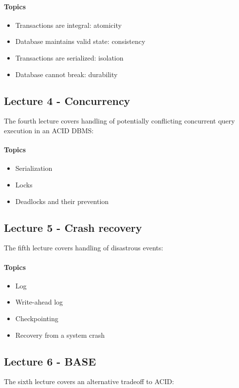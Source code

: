 		\paragraph*{Topics}
			\begin{itemize}
				\item Transactions are integral: atomicity
				\item Database maintains valid state: consistency
				\item Transactions are serialized: isolation
				\item Database cannot break: durability
			\end{itemize}


	\subsection{Lecture 4 - Concurrency}
		The fourth lecture covers handling of potentially conflicting concurrent query execution in an ACID DBMS:

		\paragraph*{Topics}
			\begin{itemize}
				\item Serialization
				\item Locks
				\item Deadlocks and their prevention
			\end{itemize}


	\subsection{Lecture 5 - Crash recovery}
		The fifth lecture covers handling of disastrous events:

		\paragraph*{Topics}
			\begin{itemize}
				\item Log
				\item Write-ahead log
				\item Checkpointing
				\item Recovery from a system crash
			\end{itemize}


	\subsection{Lecture 6 - BASE}
		The sixth lecture covers an alternative tradeoff to ACID:

